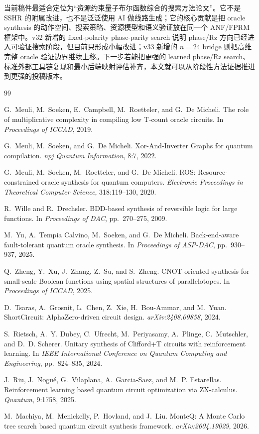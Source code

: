 \documentclass[UTF8,fontset=macnew,11pt]{ctexart}
\newcommand{\anf}{\ensuremath{\mathrm{ANF}}}
\newcommand{\fprm}{\ensuremath{\mathrm{FPRM}}}
\begin{document}
当前稿件最适合定位为“资源约束量子布尔函数综合的搜索方法论文”。它不是 SSHR 的附属改进，也不是泛泛使用 AI 做线路生成；它的核心贡献是把 oracle synthesis 的动作空间、搜索策略、资源模型和语义验证放在同一个 \anf{}/\fprm{} 框架中。v32 新增的 fixed-polarity phase-parity search 说明 phase/Rz 方向已经进入可验证搜索阶段，但目前只形成小幅改进；v33 新增的 $n=24$ bridge 则把高维完整 oracle 验证边界继续上移。下一步若能把更强的 learned phase/Rz search、标准外部工具链复现和最小后端映射评估补齐，本文就可以从阶段性方法证据推进到更强的投稿版本。

\begin{thebibliography}{99}

G.~Meuli, M.~Soeken, E.~Campbell, M.~Roetteler, and G.~De Micheli.
\newblock The role of multiplicative complexity in compiling low T-count oracle circuits.
\newblock In \emph{Proceedings of ICCAD}, 2019.

G.~Meuli, M.~Soeken, and G.~De Micheli.
\newblock Xor-And-Inverter Graphs for quantum compilation.
\newblock \emph{npj Quantum Information}, 8:7, 2022.

G.~Meuli, M.~Soeken, M.~Roetteler, and G.~De Micheli.
\newblock ROS: Resource-constrained oracle synthesis for quantum computers.
\newblock \emph{Electronic Proceedings in Theoretical Computer Science}, 318:119--130, 2020.

R.~Wille and R.~Drechsler.
\newblock BDD-based synthesis of reversible logic for large functions.
\newblock In \emph{Proceedings of DAC}, pp.~270--275, 2009.

M.~Yu, A.~Tempia Calvino, M.~Soeken, and G.~De Micheli.
\newblock Back-end-aware fault-tolerant quantum oracle synthesis.
\newblock In \emph{Proceedings of ASP-DAC}, pp.~930--937, 2025.

Q.~Zheng, Y.~Xu, J.~Zhang, Z.~Su, and S.~Zheng.
\newblock CNOT oriented synthesis for small-scale Boolean functions using spatial structures of parallelotopes.
\newblock In \emph{Proceedings of ICCAD}, 2025.

D.~Tsaras, A.~Grosnit, L.~Chen, Z.~Xie, H.~Bou-Ammar, and M.~Yuan.
\newblock ShortCircuit: AlphaZero-driven circuit design.
\newblock \emph{arXiv:2408.09858}, 2024.

S.~Rietsch, A.~Y. Dubey, C.~Ufrecht, M.~Periyasamy, A.~Plinge, C.~Mutschler, and D.~D. Scherer.
\newblock Unitary synthesis of Clifford+T circuits with reinforcement learning.
\newblock In \emph{IEEE International Conference on Quantum Computing and Engineering}, pp.~824--835, 2024.

J.~Riu, J.~Nogu{\'e}, G.~Vilaplana, A.~Garcia-Saez, and M.~P. Estarellas.
\newblock Reinforcement learning based quantum circuit optimization via ZX-calculus.
\newblock \emph{Quantum}, 9:1758, 2025.

M.~Machiya, M.~Menickelly, P.~Hovland, and J.~Liu.
\newblock MonteQ: A Monte Carlo tree search based quantum circuit synthesis framework.
\newblock \emph{arXiv:2604.19029}, 2026.

\end{thebibliography}
\end{document}
